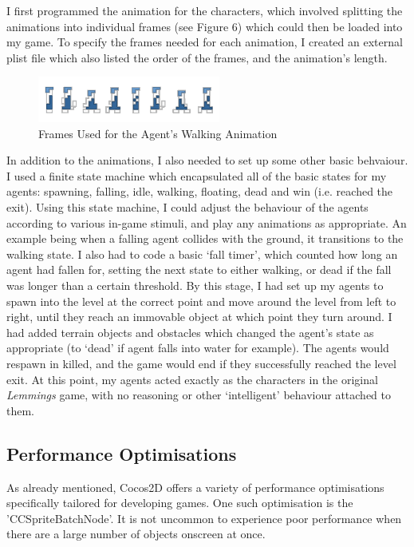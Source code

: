 \documentclass[a4paper,oneside]{report}
\begin{document}
I first programmed the animation for the characters, which involved splitting the animations into individual frames (see Figure 6) which could then be loaded into my game. To specify the frames needed for each animation, I created an external plist file which also listed the order of the frames, and the animation's length. 

\begin{figure}[h!]
  \centering
    \includegraphics[width=60mm]{sources/images/Lemming_walk_anim}
    \caption{Frames Used for the Agent's Walking Animation}
\end{figure}

In addition to the animations, I also needed to set up some other basic behvaiour. I used a finite state machine which encapsulated all of the basic states for my agents: spawning, falling, idle, walking, floating, dead and win (i.e. reached the exit). Using this state machine, I could adjust the behaviour of the agents according to various in-game stimuli, and play any animations as appropriate. An example being when a falling agent collides with the ground, it transitions to the walking state. I also had to code a basic `fall timer', which counted how long an agent had fallen for, setting the next state to either walking, or dead if the fall was longer than a certain threshold. By this stage, I had set up my agents to spawn into the level at the correct point and move around the level from left to right, until they reach an immovable object at which point they turn around. I had added terrain objects and obstacles which changed the agent's state as appropriate (to `dead' if agent falls into water for example). The agents would respawn in killed, and the game would end if they successfully reached the level exit. At this point, my agents acted exactly as the characters in the original \emph{Lemmings} game, with no reasoning or other `intelligent' behaviour attached to them.

\subsection{Performance Optimisations} 

As already mentioned, Cocos2D offers a variety of performance optimisations specifically tailored for developing games. One such optimisation is the 'CCSpriteBatchNode'. It is not uncommon to experience poor performance when there are a large number of objects onscreen at once. 
\end{document}

